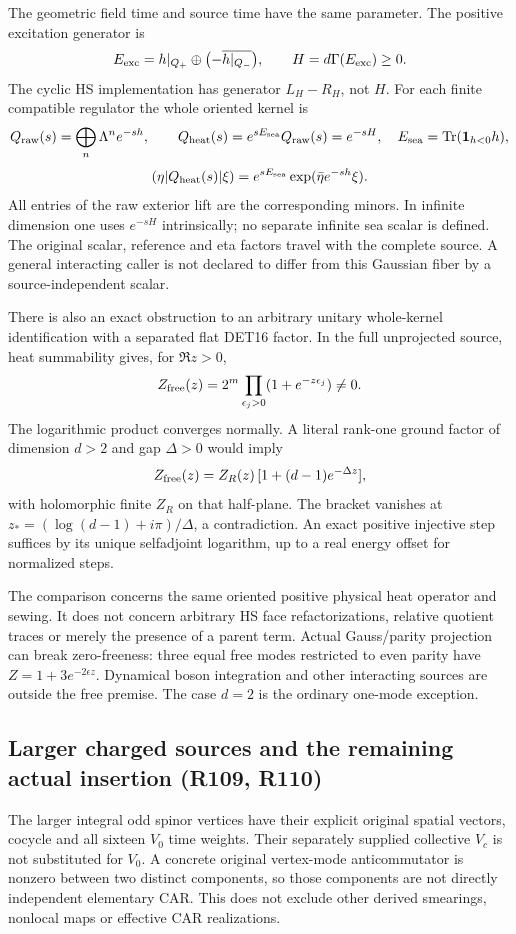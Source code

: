The geometric field time and source time have the same parameter.
The positive excitation generator is
\[
 E_{\rm exc}=h|_{Q_+}\oplus
             \bigl(-\overline{h|_{Q_-}}\bigr),\qquad
 H=d\Gamma(E_{\rm exc})\geq0 .
\]
The cyclic HS implementation has generator $L_H-R_H$, not $H$.
For each finite compatible regulator the whole oriented kernel is
\[
 Q_{\rm raw}(s)=\bigoplus_n\Lambda^n e^{-sh},\qquad
 Q_{\rm heat}(s)=e^{sE_{\rm sea}}Q_{\rm raw}(s)=e^{-sH},
 \quad E_{\rm sea}=\operatorname{Tr}(\mathbf1_{h<0}h),
\]
\[
 (\eta|Q_{\rm heat}(s)|\xi)
       =e^{sE_{\rm sea}}\exp(\bar\eta e^{-sh}\xi).
\]
All entries of the raw exterior lift are the corresponding minors.
In infinite dimension one uses $e^{-sH}$ intrinsically; no separate
infinite sea scalar is defined. The original scalar, reference and
eta factors travel with the complete source. A general interacting
caller is not declared to differ from this Gaussian fiber by a
source-independent scalar.

There is also an exact obstruction to an arbitrary unitary whole-kernel
identification with a separated flat DET16 factor. In the full
unprojected source, heat summability gives, for $\Re z>0$,
\[
 Z_{\rm free}(z)=2^m\prod_{\epsilon_j>0}(1+e^{-z\epsilon_j})\ne0.
\]
The logarithmic product converges normally. A literal rank-one
ground factor of dimension $d>2$ and gap $\Delta>0$ would imply
\[
 Z_{\rm free}(z)=Z_R(z)\,[1+(d-1)e^{-\Delta z}],
\]
with holomorphic finite $Z_R$ on that half-plane. The bracket vanishes
at $z_*=(\log(d-1)+i\pi)/\Delta$, a contradiction. An exact positive
injective step suffices by its unique selfadjoint logarithm, up to a
real energy offset for normalized steps.

The comparison concerns the same oriented positive physical heat
operator and sewing. It does not concern arbitrary HS face
refactorizations, relative quotient traces or merely the presence of
a parent term. Actual Gauss/parity projection can break zero-freeness:
three equal free modes restricted to even parity have
$Z=1+3e^{-2\epsilon z}$. Dynamical boson integration and other
interacting sources are outside the free premise. The case $d=2$
is the ordinary one-mode exception.

\subsection*{Larger charged sources and the remaining actual insertion (R109, R110)}

The larger integral odd spinor vertices have their explicit original
spatial vectors, cocycle and all sixteen $V_0$ time weights. Their
separately supplied collective $V_c$ is not substituted for $V_0$.
A concrete original vertex-mode anticommutator is nonzero between
two distinct components, so those components are not directly
independent elementary CAR. This does not exclude other derived
smearings, nonlocal maps or effective CAR realizations.

